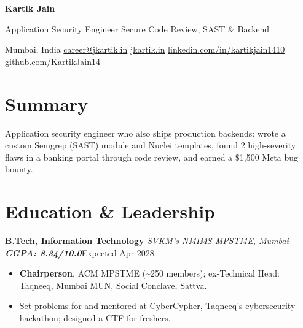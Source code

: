 \documentclass[10pt, a4paper]{article}
\newcommand{\role}[3]{\par\vspace{2.5pt}\textbf{#1} \textbar{} \textit{#2}\hfill #3\par}
\newcommand{\lnk}[2]{\href{#1}{\color{linkc}#2}}
\newcommand{\sep}{\enspace\textbar\enspace}
\begin{document}
\begin{center}
  {\fontsize{22pt}{24pt}\selectfont\bfseries Kartik Jain}\par\vspace{3pt}
  {\normalsize Application Security Engineer \textbar{} Secure Code Review, SAST \& Backend}\par\vspace{3pt}
  {\small Mumbai, India\sep
  \lnk{mailto:career@jkartik.in}{career@jkartik.in}\sep
  \lnk{https://jkartik.in/}{jkartik.in}\sep
  \lnk{https://linkedin.com/in/kartikjain1410}{linkedin.com/in/kartikjain1410}\sep
  \lnk{https://github.com/KartikJain14}{github.com/KartikJain14}}
\end{center}

\section{Summary}
Application security engineer who also ships production backends: wrote a custom Semgrep (SAST) module and Nuclei
templates, found 2 high-severity flaws in a banking portal through code review, and earned a \$1,500 Meta bug bounty.

\section{Education \& Leadership}
\role{B.Tech, Information Technology}{SVKM's NMIMS MPSTME, Mumbai \textbar{} \textup{\textbf{CGPA: 8.34/10.0}}}{Expected Apr 2028}
\begin{itemize}
  \item \textbf{Chairperson}, ACM MPSTME (\textasciitilde{}250 members); ex-Technical Head: Taqneeq, Mumbai MUN, Social Conclave, Sattva.
  \item Set problems for and mentored at CyberCypher, Taqneeq's cybersecurity hackathon; designed a CTF for freshers.
\end{itemize}
\end{document}
